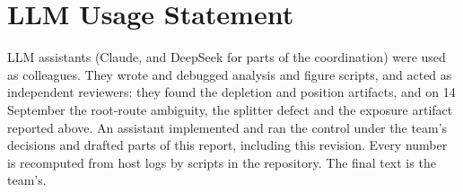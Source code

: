 \documentclass[11pt]{article}
\begin{document}
\section*{LLM Usage Statement}

LLM assistants (Claude, and DeepSeek for parts of the coordination) were used as colleagues. They
wrote and debugged analysis and figure scripts, and acted as independent reviewers: they found the
depletion and position artifacts, and on 14 September the root-route ambiguity, the splitter defect
and the exposure artifact reported above. An assistant implemented and ran the control under the
team's decisions and drafted parts of this report, including this revision. Every number is
recomputed from host logs by scripts in the repository. The final text is the team's.

\end{document}
